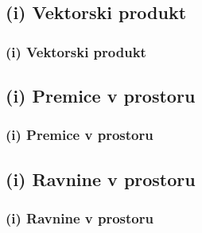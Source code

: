    \subsection{(i) Vektorski produkt}

        \begin{frame}
            \frametitle{(i) Vektorski produkt}
        \end{frame}

    \subsection{(i) Premice v prostoru}

        \begin{frame}
            \frametitle{(i) Premice v prostoru}
        \end{frame}

    \subsection{(i) Ravnine v prostoru}

        \begin{frame}
            \frametitle{(i) Ravnine v prostoru}
        \end{frame}
